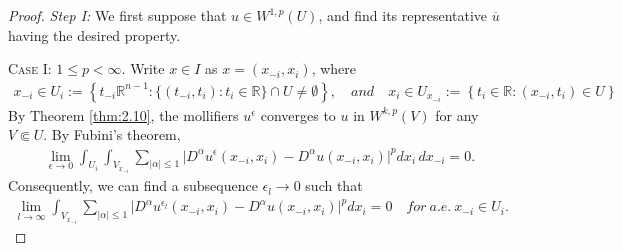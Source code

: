 \documentclass{article}
\numberwithin{equation}{section}
\newcommand{\bbR}{\mathbb{R}}
\newcommand{\ol}{\overline}
\theoremstyle{plain}
\theoremstyle{definition}
\begin{document}
\begin{proof}
\textit{Step I:} We first suppose that $u\in W^{1,p}(U)$, and find its representative $\ol{u}$ having the desired property. \vspace{0.2cm}

\textsc{Case I: $1\leq p<\infty$.}  Write $x\in I$ as $x=(x_{-i},x_i)$, where
\begin{align*}
	x_{-i}\in U_i:=\left\{t_{-i}\bbR^{n-1}:\{(t_{-i},t_i):t_i\in\bbR\}\cap U\neq\emptyset\right\},\quad and\quad x_i\in U_{x_{-i}}:=\left\{t_i\in\bbR:(x_{-i},t_i)\in U\right\}
\end{align*} 
By Theorem \ref{thm:2.10}, the mollifiers $u^\epsilon$ converges to $u$ in $W^{k,p}(V)$ for any $V\Subset U$. By Fubini's theorem,
\begin{align*}
	\lim_{\epsilon\to 0}\int_{U_i}\int_{V_{x_{-i}}}\sum_{\vert\alpha\vert\leq1}\vert D^\alpha u^{\epsilon}(x_{-i},x_i)-D^\alpha u(x_{-i},x_i)\vert^p dx_i\,dx_{-i}=0.
\end{align*}
Consequently, we can find a subsequence $\epsilon_l\to 0$ such that \begin{align}
\lim_{l\to\infty}\int_{V_{x_{-i}}}\sum_{\vert\alpha\vert\leq1}\vert D^\alpha u^{\epsilon_l}(x_{-i},x_i)-D^\alpha u(x_{-i},x_i)\vert^pdx_i=0\quad for\ a.e.\ x_{-i}\in U_i.\label{eq:2.6}
\end{align}


\end{proof}
\end{document}
